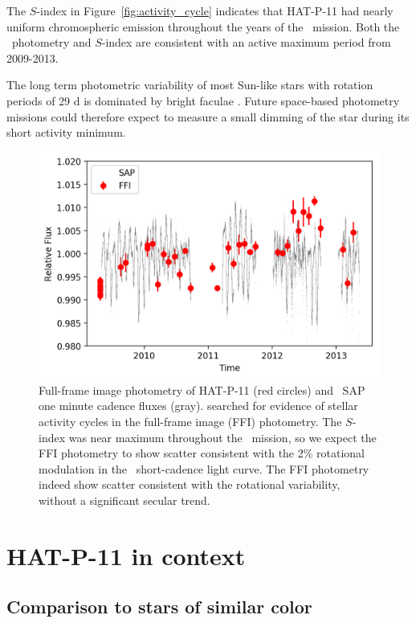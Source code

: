 The $S$-index in Figure~\ref{fig:activity_cycle} indicates that HAT-P-11 had nearly uniform chromospheric emission throughout the years of the \kepler\ mission. Both the \kepler\ photometry and $S$-index are consistent with an active maximum period from 2009-2013.

The long term photometric variability of most Sun-like stars with rotation periods of 29 d is dominated by bright faculae \citep{Montet2017}. Future space-based photometry missions could therefore expect to measure a small dimming of the star during its short activity minimum.

\begin{figure}
\begin{center}
\includegraphics[scale=0.6]{sindex/ffi.png}
\end{center}
\caption{Full-frame image photometry of HAT-P-11 (red circles) and \kepler\ SAP one minute cadence fluxes (gray). \citet{Montet2017} searched for evidence of stellar activity cycles in the full-frame image (FFI) photometry. The $S$-index was near maximum throughout the \kepler\ mission, so we expect the FFI photometry to show scatter consistent with the 2\% rotational modulation in the \kepler\ short-cadence light curve. The FFI photometry indeed show scatter consistent with the rotational variability, without a significant secular trend.}
\label{fig:ffi}
\end{figure}

\section{HAT-P-11 in context} \label{sec:cks}

\subsection{Comparison to stars of similar color} \label{sec:mittag}

